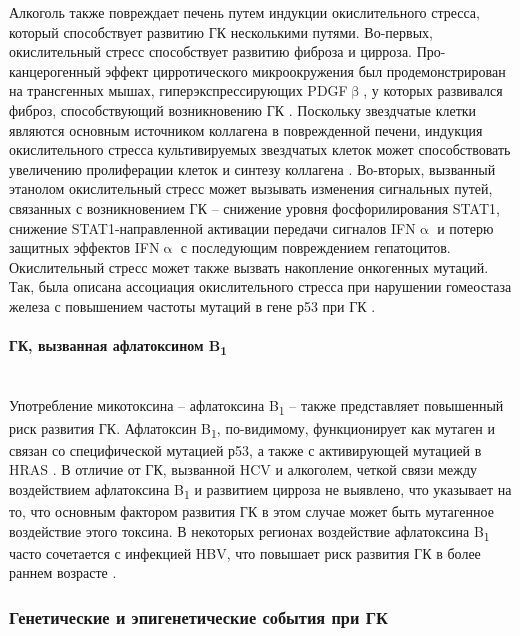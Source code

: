 Алкоголь также повреждает печень путем индукции окислительного стресса, который способствует развитию ГК несколькими путями. Во-первых, окислительный стресс способствует развитию фиброза и цирроза. Про-канцерогенный эффект цирротического микроокружения был продемонстрирован на трансгенных мышах, гиперэкспрессирующих PDGF$\upbeta$, у которых развивался фиброз, способствующий возникновению ГК \cite{campbell_platelet-derived_2005}. Поскольку звездчатые клетки являются основным источником коллагена в поврежденной печени, индукция окислительного стресса культивируемых звездчатых клеток может способствовать увеличению пролиферации клеток и синтезу коллагена \cite{farazi_hepatocellular_2006}. Во-вторых, вызванный этанолом окислительный стресс может вызывать изменения сигнальных путей, связанных с возникновением ГК – снижение уровня фосфорилирования STAT1, снижение STAT1-направленной активации передачи сигналов IFN$\upalpha$ и потерю защитных эффектов IFN$\upalpha$ с последующим повреждением гепатоцитов. Окислительный стресс может также вызвать накопление онкогенных мутаций. Так, была описана ассоциация окислительного стресса при нарушении гомеостаза железа с повышением частоты мутаций в гене р53 при ГК \cite{marrogi_oxidative_2001}.

\paragraph{ГК, вызванная афлатоксином B\textsubscript{1}}\mbox{}\\

Употребление микотоксина -- афлатоксина B\textsubscript{1} -- также представляет повышенный риск развития ГК. Афлатоксин B\textsubscript{1}, по-видимому, функционирует как мутаген и связан со специфической мутацией р53, а также с активирующей мутацией в HRAS \cite{ozturk_p53_1991, riley_vitro_1997}. В отличие от ГК, вызванной HCV и алкоголем, четкой связи между воздействием афлатоксина B\textsubscript{1} и развитием цирроза не выявлено, что указывает на то, что основным фактором развития ГК в этом случае может быть мутагенное воздействие этого токсина. В некоторых регионах воздействие афлатоксина B\textsubscript{1} часто сочетается с инфекцией HBV, что повышает риск развития ГК в более раннем возрасте \cite{kew_synergistic_2003}.

\subsubsection{Генетические и эпигенетические события при ГК}

